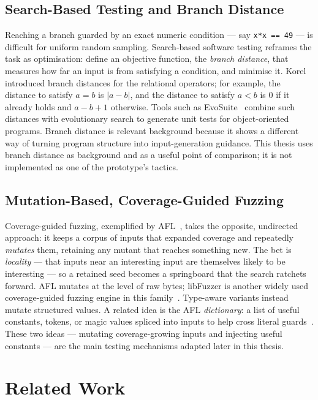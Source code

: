 \documentclass[11pt,a4paper]{report}
\begin{document}
\section{Search-Based Testing and Branch Distance}
\label{sec:sbt}

Reaching a branch guarded by an exact numeric condition — say \texttt{x*x == 49} — is difficult for uniform
random sampling. Search-based software testing reframes the task as optimisation: define an objective
function, the \emph{branch distance}, that measures how far an input is from satisfying a condition, and
minimise it. Korel~\cite{korel1990} introduced branch distances for the relational operators; for example,
the distance to satisfy $a = b$ is $|a-b|$, and the distance to satisfy $a < b$ is $0$ if it already holds
and $a-b+1$ otherwise. Tools such as EvoSuite~\cite{fraser2011} combine such distances with evolutionary
search to generate unit tests for object-oriented programs. Branch distance is relevant background because
it shows a different way of turning program structure into input-generation guidance. This thesis uses branch
distance as background and as a useful point of comparison; it is not implemented as one of the prototype's
tactics.

\section{Mutation-Based, Coverage-Guided Fuzzing}
\label{sec:cgf}

Coverage-guided fuzzing, exemplified by AFL~\cite{afl}, takes the opposite, undirected approach: it keeps a
corpus of inputs that expanded coverage and repeatedly \emph{mutates} them, retaining any mutant that
reaches something new. The bet is \emph{locality} — that inputs near an interesting input are themselves
likely to be interesting — so a retained seed becomes a springboard that the search ratchets forward. AFL
mutates at the level of raw bytes; libFuzzer is another widely used coverage-guided fuzzing engine in this
family~\cite{libfuzzer}. Type-aware variants instead mutate structured values. A related idea is the AFL
\emph{dictionary}: a list of useful constants, tokens, or magic values spliced into inputs to help cross
literal guards~\cite{afl}. These two ideas — mutating coverage-growing inputs and injecting useful constants
— are the main testing mechanisms adapted later in this thesis.

\chapter{Related Work}
\label{ch:related}
\end{document}
